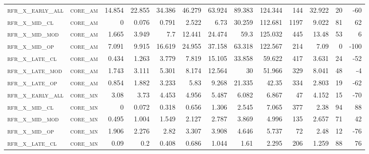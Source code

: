 \begin{landscape}
\begin{center}
\begin{footnotesize}
\begin{longtable}{llrrrrrrrr|rrr}
\textsc{rfr\_x\_early\_all} & \textsc{core\_am  }   & 14.854  & 22.855  & 34.386  & 46.279   & 63.924   & 89.383   & 124.344  & 144    & 32.922        & 20            & -60             \\
\textsc{rfr\_x\_mid\_cl   } & \textsc{core\_am  }   & 0       & 0.076   & 0.791   & 2.522    & 6.73     & 30.259   & 112.681  & 1197   & 9.022         & 81            & 62              \\
\textsc{rfr\_x\_mid\_mod  } & \textsc{core\_am  }   & 1.665   & 3.949   & 7.7     & 12.441   & 24.474   & 59.3     & 125.032  & 445    & 13.48         & 53            & 6               \\
\textsc{rfr\_x\_mid\_op   } & \textsc{core\_am  }   & 7.091   & 9.915   & 16.619  & 24.955   & 37.158   & 63.318   & 122.567  & 214    & 7.09          & 0             & -100            \\
\textsc{rfr\_x\_late\_cl  } & \textsc{core\_am  }   & 0.434   & 1.263   & 3.779   & 7.819    & 15.105   & 33.858   & 59.622   & 417    & 3.631         & 24            & -52             \\
\textsc{rfr\_x\_late\_mod } & \textsc{core\_am  }   & 1.743   & 3.111   & 5.301   & 8.174    & 12.564   & 30       & 51.966   & 329    & 8.041         & 48            & -4              \\
\textsc{rfr\_x\_late\_op  } & \textsc{core\_am  }   & 0.854   & 1.882   & 3.233   & 5.83     & 9.268    & 21.335   & 42.35    & 334    & 2.803         & 19            & -62             \\
\textsc{rfr\_x\_early\_all} & \textsc{core\_mn  }   & 3.08    & 3.73    & 4.453   & 4.956    & 5.487    & 6.082    & 6.867    & 47     & 4.152         & 15            & -70             \\
\textsc{rfr\_x\_mid\_cl   } & \textsc{core\_mn  }   & 0       & 0.072   & 0.318   & 0.656    & 1.306    & 2.545    & 7.065    & 377    & 2.38          & 94            & 88              \\
\textsc{rfr\_x\_mid\_mod  } & \textsc{core\_mn  }   & 0.495   & 1.004   & 1.549   & 2.127    & 2.787    & 3.869    & 4.996    & 135    & 2.657         & 71            & 42              \\
\textsc{rfr\_x\_mid\_op   } & \textsc{core\_mn  }   & 1.906   & 2.276   & 2.82    & 3.307    & 3.908    & 4.646    & 5.737    & 72     & 2.48          & 12            & -76             \\
\textsc{rfr\_x\_late\_cl  } & \textsc{core\_mn  }   & 0.09    & 0.2     & 0.408   & 0.686    & 1.044    & 1.61     & 2.295    & 206    & 1.259         & 88            & 76              \\

\end{longtable}
\end{footnotesize}
\end{center}
\end{landscape}
